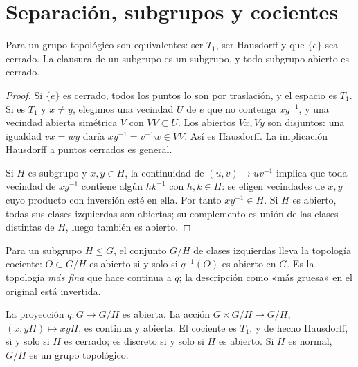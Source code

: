 \section{Separación, subgrupos y cocientes}\label{lectura:v4-16}
\begin{proposicion}
Para un grupo topológico son equivalentes: ser $T_1$, ser Hausdorff y que $\{e\}$ sea cerrado. La clausura de un subgrupo es un subgrupo, y todo subgrupo abierto es cerrado.
\end{proposicion}
\begin{proof}
Si $\{e\}$ es cerrado, todos los puntos lo son por traslación, y el espacio es $T_1$. Si es $T_1$ y $x\ne y$, elegimos una vecindad $U$ de $e$ que no contenga $xy^{-1}$, y una vecindad abierta simétrica $V$ con $VV\subset U$. Los abiertos $Vx,Vy$ son disjuntos: una igualdad $vx=wy$ daría $xy^{-1}=v^{-1}w\in VV$. Así es Hausdorff. La implicación Hausdorff a puntos cerrados es general.

Si $H$ es subgrupo y $x,y\in\overline H$, la continuidad de $(u,v)\mapsto uv^{-1}$ implica que toda vecindad de $xy^{-1}$ contiene algún $hk^{-1}$ con $h,k\in H$: se eligen vecindades de $x,y$ cuyo producto con inversión esté en ella. Por tanto $xy^{-1}\in\overline H$. Si $H$ es abierto, todas sus clases izquierdas son abiertas; su complemento es unión de las clases distintas de $H$, luego también es abierto.
\end{proof}
Para un subgrupo $H\leq G$, el conjunto $G/H$ de clases izquierdas lleva la topología cociente: $O\subset G/H$ es abierto si y solo si $q^{-1}(O)$ es abierto en $G$. Es la topología \emph{más fina} que hace continua a $q$; la descripción como «más gruesa» en el original está invertida.
\begin{teorema}\label{v4:cociente-topologico}
La proyección $q:G\to G/H$ es abierta. La acción $G\times G/H\to G/H$, $(x,yH)\mapsto xyH$, es continua y abierta. El cociente es $T_1$, y de hecho Hausdorff, si y solo si $H$ es cerrado; es discreto si y solo si $H$ es abierto. Si $H$ es normal, $G/H$ es un grupo topológico.
\end{teorema}
